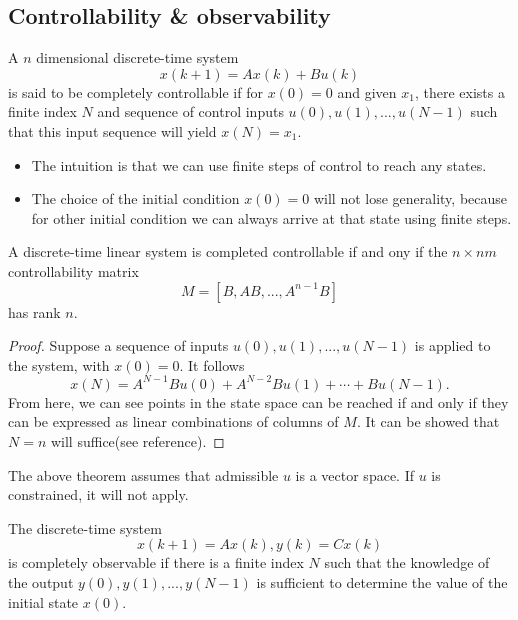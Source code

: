 \begin{refsection}
\section{Controllability \& observability}
\begin{definition}
A $n$ dimensional discrete-time system
$$x(k+1) = Ax(k) + Bu(k)$$
is said to be completely controllable if for $x(0) = 0$ and given $x_1$, there exists a finite index $N$ and sequence of control inputs $u(0),u(1),...,u(N-1)$ such that this input sequence will yield $x(N)=x_1$.
\end{definition}

\begin{remark}[interpretation]\hfill
\begin{itemize}
    \item The intuition is that we can use finite steps of control to reach any states.
    \item The choice of the initial condition $x(0) = 0$ will not lose generality, because for other initial condition we can always arrive at that state using finite steps.
\end{itemize}
\end{remark}

\begin{theorem}
\cite[278]{luenberger1979introduction}A discrete-time linear system is completed controllable if and ony if the $n\times nm$ controllability matrix
$$M=[B,AB,...,A^{n-1}B]$$
has rank $n$.
\end{theorem}
\begin{proof}
Suppose a sequence of inputs $u(0),u(1),...,u(N-1)$ is applied to the system, with $x(0) = 0$. It follows
$$x(N) = A^{N-1}Bu(0) + A^{N-2}Bu(1)+\cdots+Bu(N-1).$$
From here, we can see points in the state space can be reached if and only if they can be expressed as linear combinations of columns of $M$.
It can be showed that $N = n$ will suffice(see reference).
\end{proof}

\begin{remark}
The above theorem assumes that admissible $u$ is a vector space. If $u$ is constrained, it will not apply. 
\end{remark}



\iffalse
\begin{definition} The discrete-time system
$$x(k+1) = Ax(k),y(k) =Cx(k)$$
is completely observable if there is a finite index $N$ such that the knowledge of the output $y(0),y(1),...,y(N-1)$ is sufficient to determine the value of the initial state $x(0)$.
\end{definition}


\end{refsection}
